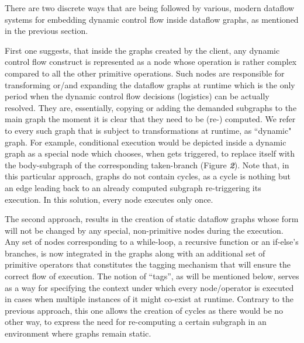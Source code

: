 \documentclass[ack,preface]{dithesis}
\begin{document}
There are two discrete ways that are being followed by various, modern dataflow systems for embedding dynamic control flow inside dataflow graphs, as mentioned in the previous section. 

First one suggests, that inside the graphs created by the client, any dynamic control flow construct is represented as a node whose operation is rather complex compared to all the other primitive operations. Such nodes are responsible for transforming or/and expanding the dataflow graphs at runtime which is the only period when the dynamic control flow decisions (logistics) can be actually resolved. They are, essentially, copying or adding the demanded subgraphs to the main graph the moment it is clear that they need to be (re-) computed. We refer to every such graph that is subject to transformations at runtime, as ``dynamic" graph.  For example, conditional execution would be depicted inside a dynamic graph as a special node which chooses, when gets triggered, to replace itself with the body-subgraph of the corresponding taken-branch (Figure \textit{\textbf{2}}).
Note that, in this particular approach, graphs do not contain cycles, as a cycle is nothing but an edge leading back to an already computed subgraph re-triggering its execution. In this solution, every node executes only once. 

The second approach, results in the creation of static dataflow graphs whose form will not be changed by any special, non-primitive nodes during the execution. Any set of nodes corresponding to a while-loop, a recursive function or an if-else’s branches, is now integrated in the graphs along with an additional set of primitive operators that constitutes the tagging mechanism that will ensure the correct flow of execution. The notion of “tags”, as will be mentioned below, serves as a way for specifying the context under which every node/operator is executed in cases when multiple instances of it might co-exist at runtime. Contrary to the previous approach, this one allows the creation of cycles as there would be no other way, to express the need for re-computing a certain subgraph in an environment where graphs remain static. 
\end{document}
